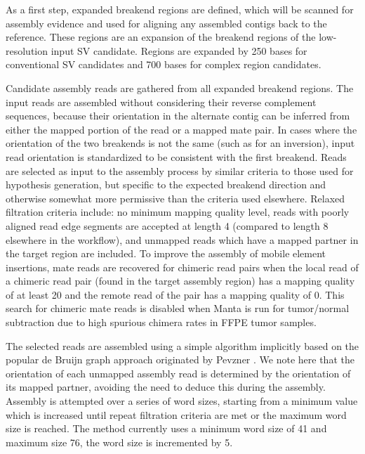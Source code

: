 \documentclass{article}
\begin{document}
As a first step, expanded breakend regions are defined, which will be scanned for assembly evidence and used for aligning any assembled contigs back to the reference. These regions are an expansion of the breakend regions of the low-resolution input SV candidate. Regions are expanded by 250 bases for conventional SV candidates and 700 bases for complex region candidates.

Candidate assembly reads are gathered from all expanded breakend regions. The input reads are assembled without considering their reverse complement sequences, because their orientation in the alternate contig can be inferred from either the mapped portion of the read or a mapped mate pair. In cases where the orientation of the two breakends is not the same (such as for an inversion), input read orientation is standardized to be consistent with the first breakend. Reads are selected as input to the assembly process by similar criteria to those used for hypothesis generation, but specific to the expected breakend direction and otherwise somewhat more permissive than the criteria used elsewhere. Relaxed filtration criteria include: no minimum mapping quality level, reads with poorly aligned read edge segments are accepted at length 4 (compared to length 8 elsewhere in the workflow), and unmapped reads which have a mapped partner in the target region are included. To improve the assembly of mobile element insertions, mate reads are recovered for chimeric read pairs when the local read of a chimeric read pair (found in the target assembly region) has a mapping quality of at least 20 and the remote read of the pair has a mapping quality of 0. This search for chimeric mate reads is disabled when Manta is run for tumor/normal subtraction due to high spurious chimera rates in FFPE tumor samples.

The selected reads are assembled using a simple algorithm implicitly based on the popular de Bruijn graph approach originated by Pevzner \citep{pevzner2001}. We note here that the orientation of each unmapped assembly read is determined by the orientation of its mapped partner, avoiding the need to deduce this during the assembly. Assembly is attempted over a series of word sizes, starting from a minimum value which is increased until repeat filtration criteria are met or the maximum word size is reached. The method currently uses a minimum word size of 41 and maximum size 76, the word size is incremented by 5.
\end{document}
